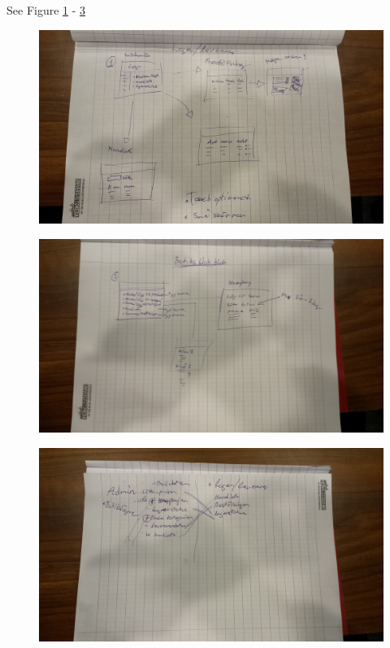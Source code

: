 \documentclass[paper=a4, fontsize=11pt]{report} %
\begin{document}
\begin{itemize}
	See Figure \ref{fig:2} - \ref{fig:4}

	\begin{figure}
		\includegraphics[scale=0.12]{artifacts/Lager.jpeg}
		\caption{}
		\label{fig:2}
	\end{figure}

	\begin{figure}
		\includegraphics[scale=0.12]{artifacts/ButiksAdmin.jpeg}
		\caption{}
		\label{fig:3}
	\end{figure}

	\begin{figure}
		\includegraphics[scale=0.12]{artifacts/Admin.jpeg}
		\caption{}
		\label{fig:4}
	\end{figure}


\end{itemize}
\end{document}
